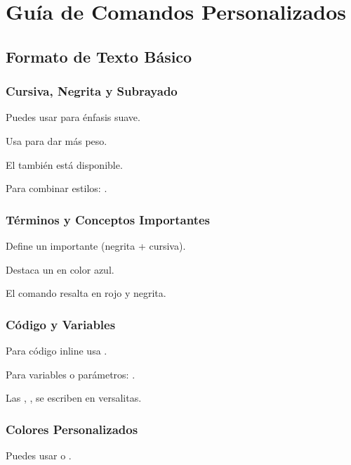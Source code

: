 \documentclass{template_pid}
\begin{document}
\chapter{Guía de Comandos Personalizados}

\section{Formato de Texto Básico}

\subsection{Cursiva, Negrita y Subrayado}

Puedes usar  para énfasis suave.

Usa  para dar más peso.

El  también está disponible.

Para combinar estilos: .

\subsection{Términos y Conceptos Importantes}

Define un  importante (negrita + cursiva).

Destaca un  en color azul.

El comando  resalta en rojo y negrita.

\subsection{Código y Variables}

Para código inline usa .

Para variables o parámetros: .

Las , ,  se escriben en versalitas.

\subsection{Colores Personalizados}

Puedes usar  o .

\end{document}
